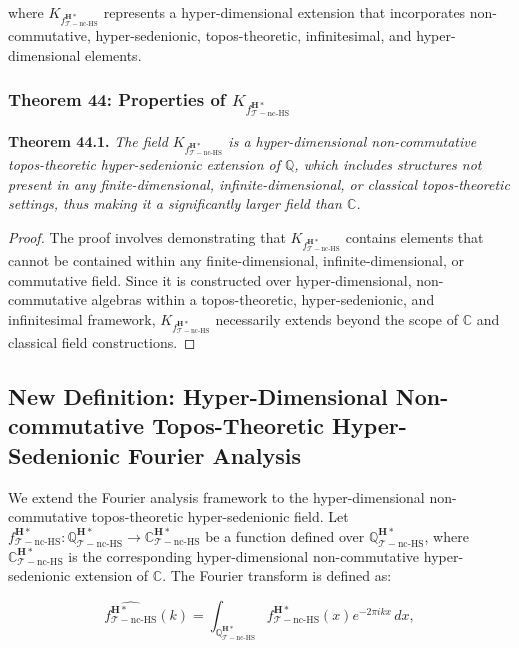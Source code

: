 \documentclass{article}
\begin{document}
where \(K_{f_{\mathcal{T}-\text{nc-HS}}^{\mathbf{H}*}}\) represents a hyper-dimensional extension that incorporates non-commutative, hyper-sedenionic, topos-theoretic, infinitesimal, and hyper-dimensional elements.

\subsubsection{Theorem 44: Properties of \(K_{f_{\mathcal{T}-\text{nc-HS}}^{\mathbf{H}*}}\)}
\textbf{Theorem 44.1.} \textit{The field \(K_{f_{\mathcal{T}-\text{nc-HS}}^{\mathbf{H}*}}\) is a hyper-dimensional non-commutative topos-theoretic hyper-sedenionic extension of \(\mathbb{Q}\), which includes structures not present in any finite-dimensional, infinite-dimensional, or classical topos-theoretic settings, thus making it a significantly larger field than \(\mathbb{C}\).}

\begin{proof}
The proof involves demonstrating that \(K_{f_{\mathcal{T}-\text{nc-HS}}^{\mathbf{H}*}}\) contains elements that cannot be contained within any finite-dimensional, infinite-dimensional, or commutative field. Since it is constructed over hyper-dimensional, non-commutative algebras within a topos-theoretic, hyper-sedenionic, and infinitesimal framework, \(K_{f_{\mathcal{T}-\text{nc-HS}}^{\mathbf{H}*}}\) necessarily extends beyond the scope of \(\mathbb{C}\) and classical field constructions.
\end{proof}

\subsection{New Definition: Hyper-Dimensional Non-commutative Topos-Theoretic Hyper-Sedenionic Fourier Analysis}
We extend the Fourier analysis framework to the hyper-dimensional non-commutative topos-theoretic hyper-sedenionic field. Let \(f_{\mathcal{T}-\text{nc-HS}}^{\mathbf{H}*}: \mathbb{Q}_{\mathcal{T}-\text{nc-HS}}^{\mathbf{H}*} \to \mathbb{C}_{\mathcal{T}-\text{nc-HS}}^{\mathbf{H}*}\) be a function defined over \(\mathbb{Q}_{\mathcal{T}-\text{nc-HS}}^{\mathbf{H}*}\), where \(\mathbb{C}_{\mathcal{T}-\text{nc-HS}}^{\mathbf{H}*}\) is the corresponding hyper-dimensional non-commutative hyper-sedenionic extension of \(\mathbb{C}\). The Fourier transform is defined as:

\[
\widehat{f_{\mathcal{T}-\text{nc-HS}}^{\mathbf{H}*}}(k) = \int_{\mathbb{Q}_{\mathcal{T}-\text{nc-HS}}^{\mathbf{H}*}} f_{\mathcal{T}-\text{nc-HS}}^{\mathbf{H}*}(x) e^{-2\pi i k x} \, dx,
\]
\end{document}
